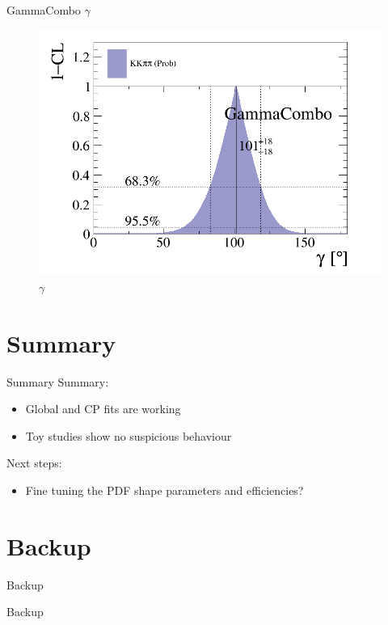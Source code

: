 \documentclass{beamer}
\begin{document}
\begin{frame}{GammaCombo $\gamma$}
  \begin{figure}[H]
    \centering
    \includegraphics[width=0.8\linewidth]{Plots/cartesian_cartesian_gamma.png}
    \caption{$\gamma$}
  \end{figure}
\end{frame}

\section{Summary}
\begin{frame}{Summary}
  Summary:
  \begin{itemize}
    \item{Global and CP fits are working}
    \item{Toy studies show no suspicious behaviour}
  \end{itemize}
  Next steps:
  \begin{itemize}
    \item{Fine tuning the PDF shape parameters and efficiencies?}
  \end{itemize}
\end{frame}

\section{Backup}
\begin{frame}{Backup}
  \begin{center}
    {\huge Backup}
  \end{center}
\end{frame}
\end{document}
